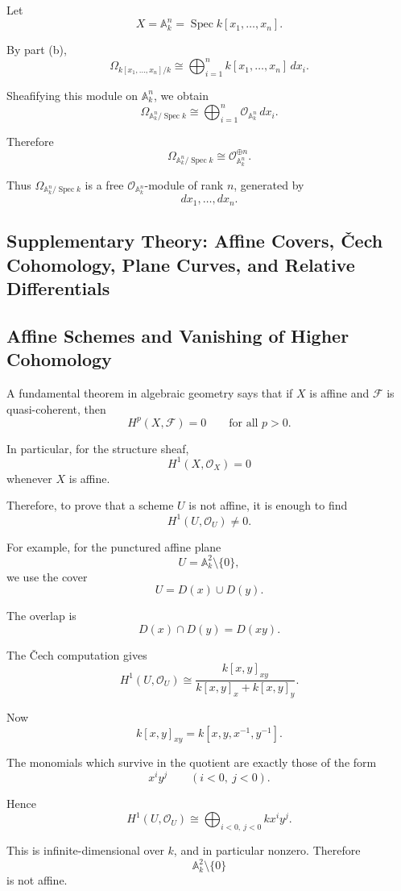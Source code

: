 Let
\[
X=\mathbb A_k^n
=
\operatorname{Spec}k[x_1,\ldots,x_n].
\]

By part (b),
\[
\Omega_{k[x_1,\ldots,x_n]/k}
\cong
\bigoplus_{i=1}^n k[x_1,\ldots,x_n]\,dx_i.
\]

Sheafifying this module on \(\mathbb A_k^n\), we obtain
\[
\Omega_{\mathbb A_k^n/\operatorname{Spec}k}
\cong
\bigoplus_{i=1}^n
\mathcal O_{\mathbb A_k^n}\,dx_i.
\]

Therefore
\[
\boxed{
	\Omega_{\mathbb A_k^n/\operatorname{Spec}k}
	\cong
	\mathcal O_{\mathbb A_k^n}^{\oplus n}.
}
\]

Thus \(\Omega_{\mathbb A_k^n/\operatorname{Spec}k}\) is a free
\(\mathcal O_{\mathbb A_k^n}\)-module of rank \(n\), generated by
\[
dx_1,\ldots,dx_n.
\]

\subsection*{Supplementary Theory: Affine Covers, \v{C}ech Cohomology, Plane Curves, and Relative Differentials}

\subsection{Affine Schemes and Vanishing of Higher Cohomology}

A fundamental theorem in algebraic geometry says that if $X$ is affine and
$\mathcal F$ is quasi-coherent, then
\[
H^p(X,\mathcal F)=0
\qquad
\text{for all }p>0.
\]

In particular, for the structure sheaf,
\[
H^1(X,\mathcal O_X)=0
\]
whenever $X$ is affine.

Therefore, to prove that a scheme $U$ is not affine, it is enough to find
\[
H^1(U,\mathcal O_U)\neq 0.
\]

For example, for the punctured affine plane
\[
U=\mathbb A_k^2\setminus\{0\},
\]
we use the cover
\[
U=D(x)\cup D(y).
\]

The overlap is
\[
D(x)\cap D(y)=D(xy).
\]

The \v{C}ech computation gives
\[
H^1(U,\mathcal O_U)
\cong
\frac{k[x,y]_{xy}}{k[x,y]_x+k[x,y]_y}.
\]

Now
\[
k[x,y]_{xy}=k[x,y,x^{-1},y^{-1}].
\]

The monomials which survive in the quotient are exactly those of the form
\[
x^iy^j
\qquad
(i<0,\ j<0).
\]

Hence
\[
H^1(U,\mathcal O_U)
\cong
\bigoplus_{i<0,\ j<0}kx^iy^j.
\]

This is infinite-dimensional over $k$, and in particular nonzero. Therefore
\[
\mathbb A_k^2\setminus\{0\}
\]
is not affine.

